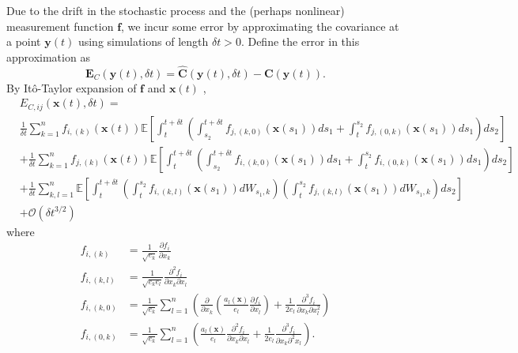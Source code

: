Due to the drift in the stochastic process and the (perhaps nonlinear) measurement function $\mathbf{f}$, we incur some error by approximating the covariance at a point $\mathbf{y}(t)$ using simulations of length $\delta t > 0$.
%
Define the error in this approximation as
\begin{equation}
\mathbf{E}_C(\mathbf{y}(t), \delta t) = \hat{\mathbf{C}}(\mathbf{y}(t), \delta t) - \mathbf{C}(\mathbf{y}(t)).
\end{equation}
%
%
By It\^{o}-Taylor expansion of $\mathbf{f}$ and $\mathbf{x}(t)$ \cite{kloeden1992numerical},
%
\begin{equation} \label{eq:cov_error}
\begin{aligned}
& E_{C, ij} (\mathbf{x}(t), \delta t) = \\
 & \frac{1}{\delta t} \sum_{k=1}^n f_{i,(k)}(\mathbf{x}(t)) \mathbb{E} \left[ \int_t^{t+\delta t} \left( \int_{s_2}^{t+\delta t} f_{j,(k,0)}(\mathbf{x}(s_1)) ds_1
+ \int_t^{s_2} f_{j,(0,k)}(\mathbf{x}(s_1)) ds_1 \right) ds_2 \right] \\
&+  \frac{1}{\delta t} \sum_{k=1}^n f_{j,(k)}(\mathbf{x}(t))  \mathbb{E} \left[ \int_t^{t+\delta t} \left( \int_{s_2}^{t + \delta t} f_{i,(k,0)}(\mathbf{x}(s_1)) ds_1
+  \int_t^{s_2} f_{i,(0,k)}(\mathbf{x}(s_1)) ds_1 \right) ds_2 \right] \\
&+  \frac{1}{\delta t} \sum_{k,l=1}^n \mathbb{E} \left[ \int_t^{t+\delta t}\left( \int_t^{s_2} f_{i,(k,l)}(\mathbf{x}(s_1)) dW_{s_1, k}  \right) \left(  \int_t^{s_2} f_{j,(k,l)}(\mathbf{x}(s_1)) dW_{s_1, k} \right) ds_2 \right] \\
&+ \mathcal{O} (\delta t^{3/2})
\end{aligned}
\end{equation}
%
where
\begin{equation}
\begin{aligned}
f_{i,(k)} &= \frac{1}{\sqrt{e_k}} \frac{\partial f_i}{\partial x_k}
\\
f_{i,(k,l)} &= \frac{1}{\sqrt{e_k e_l}} \frac{\partial^2 f_i}{\partial x_k \partial x_l}
\\
f_{i,(k,0)} &= \frac{1}{\sqrt{e_k}} \sum_{l=1}^n \left( \frac{\partial}{\partial x_k} \left( \frac{a_l(\mathbf{x})}{e_l} \frac{\partial f_i}{\partial x_l} \right) + \frac{1}{2 e_l} \frac{\partial^3 f_i}{\partial x_k \partial x_l^2} \right)
\\
f_{i,(0, k)} &= \frac{1}{\sqrt{e_k}} \sum_{l=1}^n \left( \frac{a_l(\mathbf{x})}{e_l} \frac{\partial^2 f_i}{\partial x_k \partial x_l} +\frac{1}{2 e_l}  \frac{\partial^3 f_i}{\partial x_k \partial^2 x_l} \right).
\end{aligned}
\end{equation}
